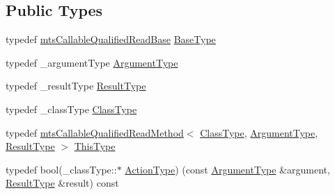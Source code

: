 \subsection*{Public Types}
\begin{DoxyCompactItemize}
\item 
typedef \hyperlink{classmts_callable_qualified_read_base}{mts\+Callable\+Qualified\+Read\+Base} \hyperlink{classmts_callable_qualified_read_method_a67c32118a2cca1e3ed70a730e6d53045}{Base\+Type}
\item 
typedef \+\_\+argument\+Type \hyperlink{classmts_callable_qualified_read_method_af34f9b3cadebbfecbd679e98c1db0e88}{Argument\+Type}
\item 
typedef \+\_\+result\+Type \hyperlink{classmts_callable_qualified_read_method_a728e57693d845188e5c248a6437f843e}{Result\+Type}
\item 
typedef \+\_\+class\+Type \hyperlink{classmts_callable_qualified_read_method_a6cfee5c3c3c49c691c2f5176ea79d735}{Class\+Type}
\item 
typedef \hyperlink{classmts_callable_qualified_read_method}{mts\+Callable\+Qualified\+Read\+Method}$<$ \hyperlink{classmts_callable_qualified_read_method_a6cfee5c3c3c49c691c2f5176ea79d735}{Class\+Type}, \hyperlink{classmts_callable_qualified_read_method_af34f9b3cadebbfecbd679e98c1db0e88}{Argument\+Type}, \hyperlink{classmts_callable_qualified_read_method_a728e57693d845188e5c248a6437f843e}{Result\+Type} $>$ \hyperlink{classmts_callable_qualified_read_method_a4eae6a460f791fe12b4dcf83d83d429e}{This\+Type}
\item 
typedef bool(\+\_\+class\+Type\+::$\ast$ \hyperlink{classmts_callable_qualified_read_method_a6327de6d1017295be394178d8e03b121}{Action\+Type}) (const \hyperlink{classmts_callable_qualified_read_method_af34f9b3cadebbfecbd679e98c1db0e88}{Argument\+Type} \&argument, \hyperlink{classmts_callable_qualified_read_method_a728e57693d845188e5c248a6437f843e}{Result\+Type} \&result) const 
\end{DoxyCompactItemize}
